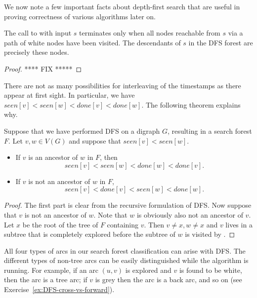 We now note a few important facts about depth-first search that are
useful in proving correctness of various algorithms later on. 

\begin{Theorem}
\label{thm:white-path}
The call to  with input $s$ terminates only when all nodes reachable from $s$ via a path of white nodes have been visited. The descendants of $s$ in the DFS forest are precisely these nodes. 
\end{Theorem}

\begin{proof}
 **** FIX *****
\end{proof}


There are not as many possibilities for interleaving of the timestamps as there appear at first sight. In particular, we  have $seen[v] < seen[w] < done[v] < done[w]$. The following theorem explains why.

\begin{Theorem}
\label{thm:DFS-seen-done}
Suppose that we have performed DFS on a digraph $G$, resulting in a search forest $F$. Let $v, w\in V(G)$ and suppose that $seen[v] < seen[w]$. 

\begin{itemize}
\item
If $v$ is an ancestor of $w$ in $F$, then 
$$seen[v] < seen[w] < done[w] < done[v].$$
\item
If $v$ is not an ancestor of $w$ in $F$,
$$seen[v] < done[v]  < seen[w] < done[w].$$

\end{itemize}
\end{Theorem}

\begin{proof} The first part is clear from the recursive formulation of DFS. Now suppose that $v$ is not an ancestor of $w$. Note that $w$ is obviously also not an ancestor of $v$. Let $x$ be the root of the tree of $F$ containing $v$. Then $v\neq x, w\neq x$ and $v$ lives in a subtree that is completely explored before the subtree of $w$ is visited by .

\end{proof}

All four types of arcs in our search forest classification can arise
with DFS. The different types of non-tree arcs can be easily
distinguished while the algorithm is running. For example, if an arc
$(u, v)$ is explored and $v$ is found to be white, then the arc is a
tree arc; if $v$ is grey then the arc is a back arc, and so on (see Exercise~\ref{ex:DFS-cross-vs-forward}).


